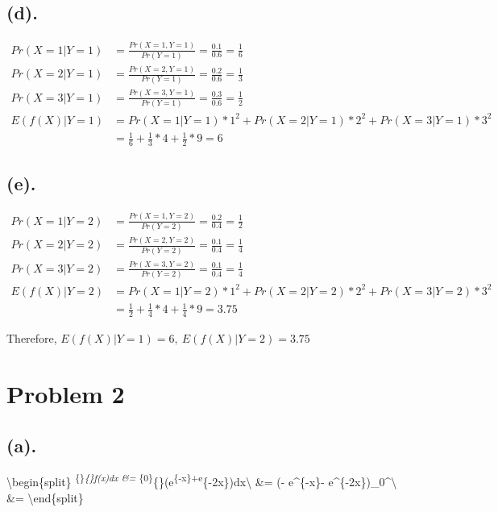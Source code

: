 \documentclass[11pt]{article}
\begin{document}
    \hypertarget{d.}{%
\subsection{(d).}\label{d.}}

\begin{align*}
Pr(X = 1 | Y = 1) &= \frac{Pr(X=1,Y=1)}{Pr(Y=1)}=\frac{0.1}{0.6}=\frac{1}{6}\\
Pr(X = 2 | Y = 1) &= \frac{Pr(X=2,Y=1)}{Pr(Y=1)}=\frac{0.2}{0.6}=\frac{1}{3}\\
Pr(X = 3 | Y = 1) &= \frac{Pr(X=3,Y=1)}{Pr(Y=1)}=\frac{0.3}{0.6}=\frac{1}{2}\\
E(f(X)|Y=1) &= Pr(X = 1 | Y = 1)*1^2+Pr(X = 2 | Y = 1)*2^2+Pr(X = 3 | Y = 1)*3^2\\
&=\frac{1}{6}+\frac{1}{3}*4+\frac{1}{2}*9=6
\end{align*}

    \hypertarget{e.}{%
\subsection{(e).}\label{e.}}

\begin{align*}
Pr(X = 1 | Y = 2) &= \frac{Pr(X=1,Y=2)}{Pr(Y=2)}=\frac{0.2}{0.4}=\frac{1}{2}\\
Pr(X = 2 | Y = 2) &= \frac{Pr(X=2,Y=2)}{Pr(Y=2)}=\frac{0.1}{0.4}=\frac{1}{4}\\
Pr(X = 3 | Y = 2) &= \frac{Pr(X=3,Y=2)}{Pr(Y=2)}=\frac{0.1}{0.4}=\frac{1}{4}\\
E(f(X)|Y=2) &= Pr(X = 1 | Y = 2)*1^2+Pr(X = 2 | Y = 2)*2^2+Pr(X = 3 | Y = 2)*3^2\\
&=\frac{1}{2}+\frac{1}{4}*4+\frac{1}{4}*9=3.75
\end{align*}

Therefore, \(E(f(X)|Y=1) =6,~E(f(X)|Y=2)=3.75\)

    \hypertarget{problem-2}{%
\section{Problem 2}\label{problem-2}}

    \hypertarget{a.}{%
\subsection{(a).}\label{a.}}

\textbackslash{}begin\{split\}
\int\textsuperscript{\{\infty\}\emph{\{\infty\}f(x)dx \&=
\int}\{0\}}\{\infty\}(e\textsuperscript{\{-\theta x\}+e}\{-2\theta x\})dx\textbackslash{}
\&= (-  e\^{}\{-\theta x\}-
e\^{}\{-2\theta x\})\Big\textbar{}\_0\^{}\infty\textbackslash{}
\&= \textbackslash{}end\{split\}
\end{document}
